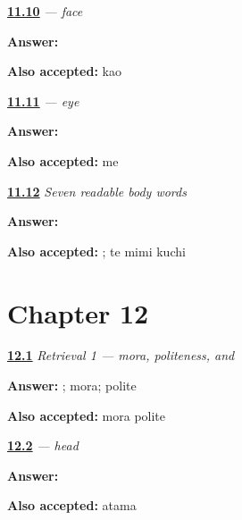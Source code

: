 \noindent\begin{minipage}[t]{\linewidth}
\raggedright
\hyperlink{review-JA-C11-kao-meaning}{\textbf{11.10}} \emph{ — face}\par
\small \textbf{Answer:} \par
\footnotesize \textbf{Also accepted:} kao
\end{minipage}\par\medskip

\noindent\begin{minipage}[t]{\linewidth}
\raggedright
\hyperlink{review-JA-C11-me-eye-meaning}{\textbf{11.11}} \emph{ — eye}\par
\small \textbf{Answer:} \par
\footnotesize \textbf{Also accepted:} me
\end{minipage}\par\medskip

\noindent\begin{minipage}[t]{\linewidth}
\raggedright
\hyperlink{review-JA-C11-body-map-recall}{\textbf{11.12}} \emph{Seven readable body words}\par
\small \textbf{Answer:} \par
\footnotesize \textbf{Also accepted:}   ; te mimi kuchi
\end{minipage}\par\medskip

\section*{Chapter 12}

\noindent\begin{minipage}[t]{\linewidth}
\raggedright
\hyperlink{review-JA-R12-foundation-01-card}{\textbf{12.1}} \emph{Retrieval 1 — mora, politeness, and }\par
\small \textbf{Answer:} ; mora; polite\par
\footnotesize \textbf{Also accepted:}           mora polite
\end{minipage}\par\medskip

\noindent\begin{minipage}[t]{\linewidth}
\raggedright
\hyperlink{review-JA-C12-atama-write}{\textbf{12.2}} \emph{ — head}\par
\small \textbf{Answer:} \par
\footnotesize \textbf{Also accepted:} atama
\end{minipage}\par\medskip


